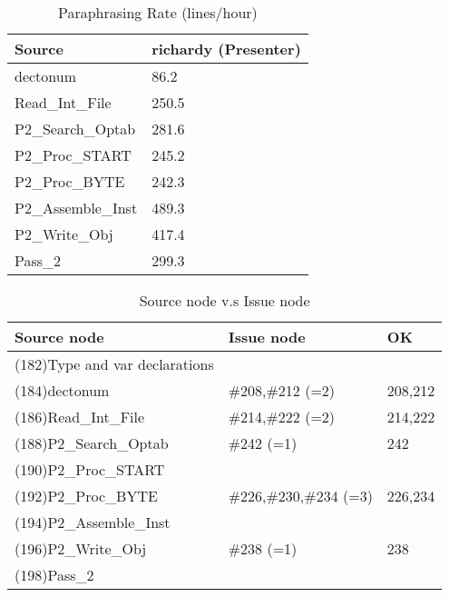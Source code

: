 \begin{table}[hb]
\begin{center}
\begin{tabular}{|l|l|}
\hline
Source & richardy (Presenter)\\
\hline
dectonum & 86.2\\
Read\_Int\_File & 250.5\\
P2\_Search\_Optab & 281.6\\
P2\_Proc\_START & 245.2\\
P2\_Proc\_BYTE & 242.3\\
P2\_Assemble\_Inst & 489.3\\
P2\_Write\_Obj & 417.4\\
Pass\_2 & 299.3\\
\hline
\end{tabular}
\end{center}
\caption{Paraphrasing Rate (lines/hour)}
\end{table}


\begin{table}[hb]
\begin{center}
\begin{tabular}{|l|l|l|}
\hline
Source node & Issue node  & OK\\
\hline
(182)Type and var declarations &  & \\
(184)dectonum & \#208,\#212 (=2) & 208,212\\
(186)Read\_Int\_File & \#214,\#222 (=2) & 214,222 \\
(188)P2\_Search\_Optab & \#242 (=1) & 242\\
(190)P2\_Proc\_START &  & \\
(192)P2\_Proc\_BYTE & \#226,\#230,\#234 (=3) & 226,234\\
(194)P2\_Assemble\_Inst &  & \\
(196)P2\_Write\_Obj & \#238 (=1) & 238\\
(198)Pass\_2 &  & \\
\hline
\end{tabular}
\caption{Source node v.s Issue node}
\end{center}
\end{table}

